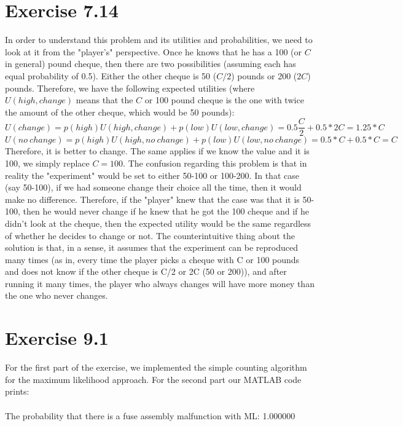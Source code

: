 \documentclass[11pt,a4paper,oneside]{report}
\begin{document}
\section*{Exercise 7.14}
In order to understand this problem and its utilities and probabilities, we need to look at it from the "player's" perspective. Once he knows that he has a 100 (or $C$ in general) pound cheque, then there are two possibilities (assuming each has equal probability of 0.5). Either the other cheque is 50 ($C/2$) pounds or 200 ($2C$) pounds. Therefore, we have the following expected utilities (where $U(high,change)$ means that the $C$ or 100 pound cheque is the one with twice the amount of the other cheque, which would be 50 pounds):\\
$$U(change) = p(high)U(high,change) + p(low)U(low,change) = 0.5\frac{C}{2} + 0.5*2C = 1.25*C$$
$$U(no\ change) = p(high)U(high,no\ change) + p(low)U(low,no\ change) = 0.5*C + 0.5*C = C$$
Therefore, it is better to change. The same applies if we know the value and it is 100, we simply replace $C = 100$. The confusion regarding this problem is that in reality the "experiment" would be set to either 50-100 or 100-200. In that case (say 50-100), if we had someone change their choice all the time, then it would make no difference. Therefore, if the "player" knew that the case was that it is 50-100, then he would never change if he knew that he got the 100 cheque and if he didn't look at the cheque, then the expected utility would be the same regardless of whether he decides to change or not. The counterintuitive thing about the solution is that, in a sense, it assumes that the experiment can be reproduced many times (as in, every time the player picks a cheque with C or 100 pounds and does not know if the other cheque is C/2 or 2C (50 or 200)), and after running it many times, the player who always changes will have more money than the one who never changes.

\section*{Exercise 9.1}

For the first part of the exercise, we implemented the simple counting algorithm for the maximum likelihood approach. For the second part our MATLAB code prints:\\\\
The probability that there is a fuse assembly malfunction with ML: 1.000000\\\\
\end{document}
